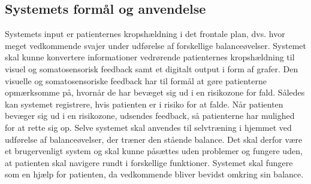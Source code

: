 \subsection{Systemets formål og anvendelse}\label{formaal_anvendelse}
Systemets input er patienternes kropshældning i det frontale plan, dvs. hvor meget vedkommende svajer under udførelse af forskellige balanceøvelser. %
Systemet skal kunne konvertere informationer vedrørende patienternes kropshældning til visuel og somatosensorisk feedback samt et digitalt output i form af grafer. Den visuelle og somatosensoriske feedback har til formål at gøre patienterne opmærksomme på, hvornår de har bevæget sig ud i en risikozone for fald. Således kan systemet registrere, hvis patienten er i risiko for at falde. Når patienten bevæger sig ud i en risikozone, udsendes feedback, så patienterne har mulighed for at rette sig op. Selve systemet skal anvendes til selvtræning i hjemmet ved udførelse af balanceøvelser, der træner den stående balance. Det skal derfor være et brugervenligt system og skal kunne påsættes uden problemer og fungere uden, at patienten skal navigere rundt i forskellige funktioner. Systemet skal fungere som en hjælp for patienten, da vedkommende bliver bevidst omkring sin balance.%

